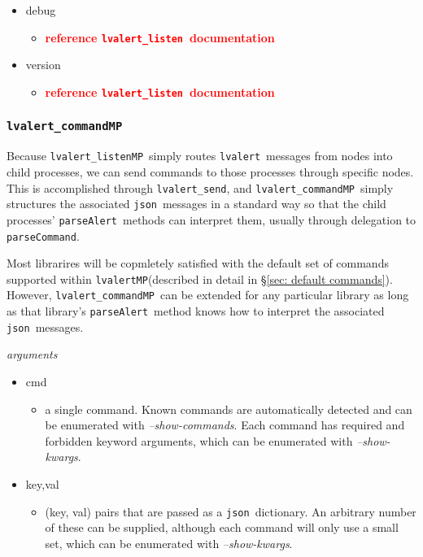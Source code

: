 \documentclass{article}
\newcommand{\FIXME}[1]{\textcolor{red}{\textbf{#1}}}
\newcommand{\alert}{\texttt{lvalert}}
\newcommand{\lvalertListen}{\texttt{lvalert\_listen}}
\newcommand{\lvalertSend}{\texttt{lvalert\_send}}
\newcommand{\lvalertMP}{\texttt{lvalertMP}}
\newcommand{\lvalertListenMP}{\texttt{lvalert\_listenMP}}
\newcommand{\lvalertCommandMP}{\texttt{lvalert\_commandMP}}
\newcommand{\parseAlert}{\texttt{parseAlert}}
\newcommand{\parseCommand}{\texttt{parseCommand}}
\newcommand{\json}{\texttt{json}}
\begin{document}
\begin{itemize}
{        \begin{itemize}
            \item{\FIXME{reference \lvalertListen~documentation}}
        \end{itemize}
         }
    \item{debug
        \begin{itemize}
            \item{\FIXME{reference \lvalertListen~documentation}}
        \end{itemize}
         }
    \item{version
        \begin{itemize}
            \item{\FIXME{reference \lvalertListen~documentation}}
        \end{itemize}
         }
\end{itemize}


\subsubsection{\lvalertCommandMP}
\label{sec: lvalertCommandMP}

Because \lvalertListenMP~simply routes \alert~messages from nodes into child processes, we can send commands to those processes through specific nodes.
This is accomplished through \lvalertSend, and \lvalertCommandMP~simply structures the associated \json~messages in a standard way so that the child processes' \parseAlert~methods can interpret them, usually through delegation to \parseCommand.

Most librarires will be copmletely satisfied with the default set of commands supported within \lvalertMP (described in detail in \S\ref{sec: default commands}).
However, \lvalertCommandMP~can be extended for any particular library as long as that library's \parseAlert~method knows how to interpret the associated \json~messages.

\vspace{0.5cm}
\noindent
\textit{arguments}

\begin{itemize}
    \item{cmd
        \begin{itemize}
            \item{a single command. Known commands are automatically detected and can be enumerated with \textit{--show-commands}. Each command has required and forbidden keyword arguments, which can be enumerated with \textit{--show-kwargs}.}
        \end{itemize}
         }
    \item{key,val
        \begin{itemize}
            \item{(key, val) pairs that are passed as a \json~dictionary. An arbitrary number of these can be supplied, although each command will only use a small set, which can be enumerated with \textit{--show-kwargs}.}
        \end{itemize}
         }
\end{itemize}
\end{document}
